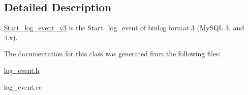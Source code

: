 \subsection{Detailed Description}
\mbox{\hyperlink{classStart__log__event__v3}{Start\+\_\+log\+\_\+event\+\_\+v3}} is the Start\+\_\+log\+\_\+event of binlog format 3 (My\+S\+QL 3. and 4.\+x). 

The documentation for this class was generated from the following files\+:\begin{DoxyCompactItemize}
\item 
\mbox{\hyperlink{log__event_8h}{log\+\_\+event.\+h}}\item 
log\+\_\+event.\+cc\end{DoxyCompactItemize}
